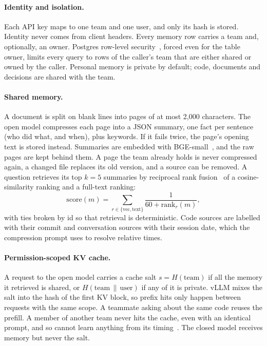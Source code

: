 \documentclass[10pt,twocolumn]{article}
\begin{document}
\paragraph{Identity and isolation.} Each API key maps to one team and one user, and only its hash is stored. Identity never comes from client headers. Every memory row carries a team and, optionally, an owner. Postgres row-level security~\citep{postgresrls}, forced even for the table owner, limits every query to rows of the caller's team that are either shared or owned by the caller. Personal memory is private by default; code, documents and decisions are shared with the team.

\paragraph{Shared memory.} A document is split on blank lines into pages of at most 2{,}000 characters. The open model compresses each page into a JSON summary, one fact per sentence (who did what, and when), plus keywords. If it fails twice, the page's opening text is stored instead. Summaries are embedded with BGE-small~\citep{xiao2023cpack}, and the raw pages are kept behind them. A page the team already holds is never compressed again, a changed file replaces its old version, and a source can be removed. A question retrieves its top $k{=}5$ summaries by reciprocal rank fusion~\citep{cormack2009rrf} of a cosine-similarity ranking and a full-text ranking:
\begin{equation}
\mathrm{score}(m)=\sum_{r\in\{\text{vec},\text{text}\}} \frac{1}{60+\mathrm{rank}_r(m)},
\end{equation}
with ties broken by id so that retrieval is deterministic. Code sources are labelled with their commit and conversation sources with their session date, which the compression prompt uses to resolve relative times.

\paragraph{Permission-scoped KV cache.} A request to the open model carries a cache salt $s=H(\text{team})$ if all the memory it retrieved is shared, or $H(\text{team}\,\|\,\text{user})$ if any of it is private. vLLM mixes the salt into the hash of the first KV block, so prefix hits only happen between requests with the same scope. A teammate asking about the same code reuses the prefill. A member of another team never hits the cache, even with an identical prompt, and so cannot learn anything from its timing~\citep{song2024earlybird}. The closed model receives memory but never the salt.
\end{document}
